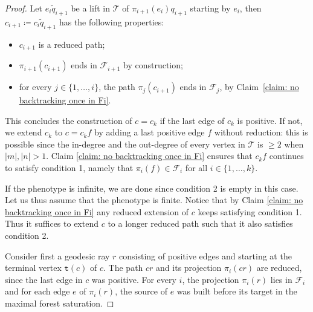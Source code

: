 \documentclass[12pt]{article}
\numberwithin{equation}{section}
\theoremstyle{definition}
\newcommand\Tree{\mathcal{T}}
\newcommand{\target}{\mathtt{t}}
\newcommand\pathinT{c}
\begin{document}
\begin{proof}
                        
            Let $e_i\tilde q_{i+1}$ be a lift in $\Tree$ of $\pi_{i+1}(e_i) q_{i+1}$ starting by $e_i$, 
            then $\pathinT_{i+1} \coloneqq \pathinT_i \tilde q_{i+1}$ has the following properties:
            \begin{itemize}
                \item $\pathinT_{i+1}$ is a reduced path;
                \item $\pi_{i+1}(\pathinT_{i+1})$ ends in $\mathcal{F}_{i+1}$ by construction;
                \item for every $j\in \{1, \ldots, i\}$, the path $\pi_j(\pathinT_{i+1})$ ends in $\mathcal{F}_j$, by Claim~\ref{claim: no backtracking once in Fi}.
            \end{itemize}


            
            
            This concludes the construction of $\pathinT = \pathinT_{k}$ if the last edge of $\pathinT_{k}$ is positive. 
            If not, we extend $\pathinT_{k}$ to $\pathinT=\pathinT_{k}f$ by adding a last positive edge $f$ without reduction: this is possible since the in-degree and the out-degree of every vertex in $\Tree$ is $\geq 2$ when $\vert m\vert ,\vert n\vert>1$. Claim \ref{claim: no backtracking once in Fi} ensures that $\pathinT_{k}f$ continues to satisfy condition 1, namely that $\pi_i(f)\in \mathcal{F}_i$ for all $i\in\{1,\dots,k\}$.

            If the phenotype is infinite, we are done since condition 2 is empty in this case.
            Let us thus assume that the phenotype is finite. 
            Notice that by Claim \ref{claim: no backtracking once in Fi} any reduced extension of $\pathinT$  keeps satisfying condition 1. Thus it suffices to extend $\pathinT$ to a longer reduced path such that it
            also satisfies condition 2.

            
        Consider first a geodesic ray $r$ consisting of positive edges and starting at the terminal vertex $\target(\pathinT)$ of $\pathinT$.
        The path $\pathinT r$ and its projection $\pi_i(\pathinT r)$ are reduced,
        since the last edge in $\pathinT$ was positive.
        For every $i$, the projection $\pi_i(r)$ lies in $\mathcal{F}_i$ and for each edge $e$ of $\pi_i(r)$, 
        the source of $e$ was built before its target in the maximal forest saturation.




\end{proof}
\end{document}
